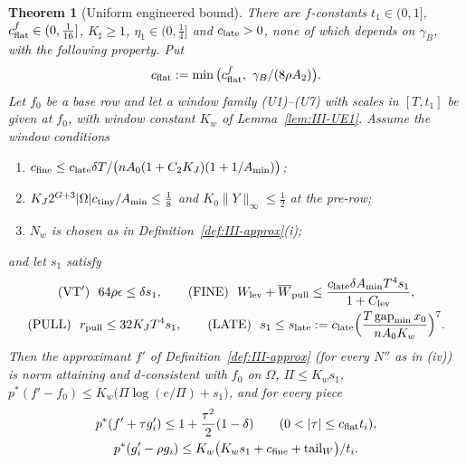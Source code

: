 \documentclass[10pt]{amsart}
\newtheorem{theorem}{Theorem}[section]
\theoremstyle{definition}
\theoremstyle{remark}
\newcommand{\gap}{\operatorname{gap}}
\begin{document}
\begin{theorem}[Uniform engineered bound]\label{thm:III-UE}
There are $f$-constants $t_1\in(0,1]$, $c^f_{\rm flat}\in(0,\frac1{16}]$,
$K_\sharp\ge1$, $\eta_1\in(0,\frac14]$ and $c_{\rm late}>0$, none of which
depends on $\gamma_B$, with the following property.  Put
\[
 c_{\rm flat}:=\min\big(c^f_{\rm flat},\ \gamma_B/(8\rho A_2)\big).
\]
Let $f_0$ be a base row and let a window family \textup{(U1)--(U7)} with scales
in $[T,t_1]$ be given at $f_0$, with window constant $K_w$ of
Lemma~\textup{\ref{lem:III-UE1}}.  Assume the \emph{window conditions}
\begin{enumerate}
\item[(W-a)] $c_{\rm fine}\le c_{\rm late}\delta T/\big(nA_0(1+C_2K_J)(1+
1/A_{\min})\big)$;
\item[(W-b)] $K_J2^{G+3}|\Omega|c_{\rm tiny}/A_{\min}\le\frac18$ and
$K_0\|Y\|_\infty\le\frac12$ at the pre-row;
\item[(W-c)] $N_w$ is chosen as in Definition~\textup{\ref{def:III-approx}(i)};
\end{enumerate}
and let $s_1$ satisfy
\begin{gather*}
 \textup{(VT$'$)}\ \ 64\rho\epsilon\le\delta s_1,\qquad
 \textup{(FINE)}\ \ W_{\rm lev}+\overline W_{\rm pull}\le\frac{c_{\rm late}\delta A_{\min}
 T^4s_1}{1+C_{\rm lev}},\\ \textup{(PULL)}\ \ r_{\rm pull}\le32K_JT^4s_1,\qquad
 \textup{(LATE)}\ \ s_1\le s_{\rm late}:=c_{\rm late}\Big(\frac{T\gap_{\min}x_0}
 {nA_0K_w}\Big)^7 .
\end{gather*}
Then the approximant $f'$ of Definition~\textup{\ref{def:III-approx}} \textup{(}for
every $N''$ as in (iv)\textup{)} is norm attaining and $d$-consistent with $f_0$
on $\Omega$, $\Pi\le K_ws_1$, $p^*(f'-f_0)\le K_w\big(\Pi\log(e/\Pi)+s_1\big)$,
and for every piece
\begin{gather}
 p^*(f'+\tau g'_i)\le1+\frac{\tau^2}2(1-\delta)\qquad(0<|\tau|\le c_{\rm flat}t_i),
 \label{eq:III-UE}\\
 p^*(g'_i-\rho g_i)\le K_w\big(K_ws_1+c_{\rm fine}+\mathrm{tail}_W\big)/t_i .
 \notag
\end{gather}
\end{theorem}
\end{document}
